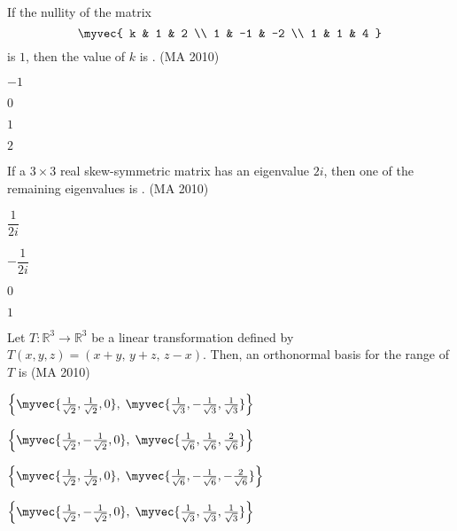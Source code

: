 \item If the nullity of the matrix 
\[
\myvec{ k & 1 & 2 \\ 1 & -1 & -2 \\ 1 & 1 & 4 }
\]
is $1$, then the value of $k$ is \underline{\hspace{2cm}}.
\hfill(MA 2010)
\begin{enumerate}
\begin{multicols}{4}
\item $-1$
\item $0$
\item $1$
\item $2$
\end{multicols}
\end{enumerate}
\item If a $3\times 3$ real skew-symmetric matrix has an eigenvalue $2i$, then one of the remaining eigenvalues is \underline{\hspace{2cm}}.
\hfill(MA 2010)
\begin{enumerate}
\begin{multicols}{4}
\item $\dfrac{1}{2i}$
\item $-\dfrac{1}{2i}$
\item $0$
\item $1$
\end{multicols}
\end{enumerate}
\item Let $T:\mathbb{R}^3\to\mathbb{R}^3$ be a linear transformation defined by $T(x,y,z)=(x+y,\,y+z,\,z-x)$. Then, an orthonormal basis for the range of $T$ is \underline{\hspace{2cm}}
\hfill(MA 2010)
\begin{enumerate}
\begin{multicols}{2}
    \item $\left\{\myvec{\tfrac{1}{\sqrt{2}},\tfrac{1}{\sqrt{2}},0},\;\myvec{\tfrac{1}{\sqrt{3}},-\tfrac{1}{\sqrt{3}},\tfrac{1}{\sqrt{3}}}\right\}$

\item $\left\{\myvec{\tfrac{1}{\sqrt{2}},-\tfrac{1}{\sqrt{2}},0},\;\myvec{\tfrac{1}{\sqrt{6}},\tfrac{1}{\sqrt{6}},\tfrac{2}{\sqrt{6}}}\right\}$

\item $\left\{\myvec{\tfrac{1}{\sqrt{2}},\tfrac{1}{\sqrt{2}},0},\;\myvec{\tfrac{1}{\sqrt{6}},-\tfrac{1}{\sqrt{6}},-\tfrac{2}{\sqrt{6}}}\right\}$

\item $\left\{\myvec{\tfrac{1}{\sqrt{2}},-\tfrac{1}{\sqrt{2}},0},\;\myvec{\tfrac{1}{\sqrt{3}},\tfrac{1}{\sqrt{3}},\tfrac{1}{\sqrt{3}}}\right\}$
\end{multicols}
\end{enumerate}
